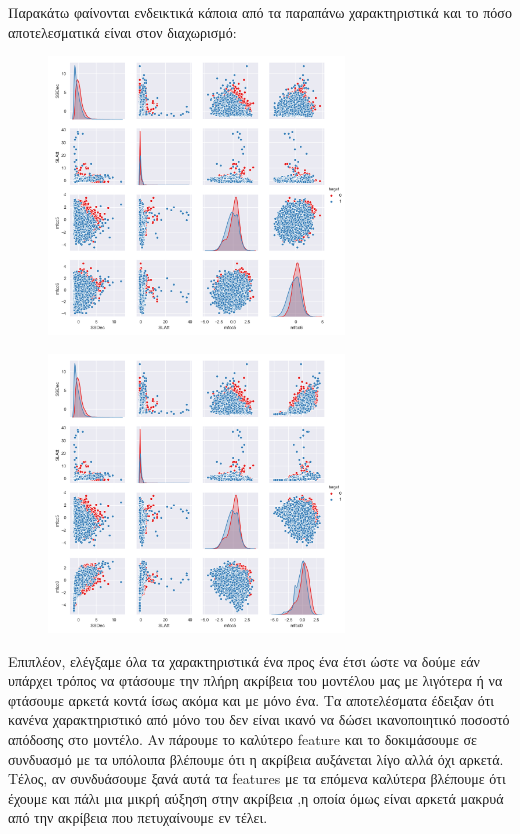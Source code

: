 Παρακάτω φαίνονται ενδεικτικά κάποια από τα παραπάνω χαρακτηριστικά και το πόσο αποτελεσματικά είναι στον διαχωρισμό:

\begin{figure}[h]
\centering
\includegraphics[width=0.7\textwidth]{figure_1.png}
\end{figure}
\begin{figure}[h]
\centering
\includegraphics[width=0.7\textwidth]{figure_2.png}
\end{figure}


Eπιπλέον, ελέγξαμε όλα τα χαρακτηριστικά ένα προς ένα έτσι ώστε να δούμε εάν υπάρχει τρόπος να φτάσουμε την πλήρη ακρίβεια του μοντέλου μας με λιγότερα ή να φτάσουμε αρκετά κοντά ίσως ακόμα και με μόνο ένα. 
Tα αποτελέσματα έδειξαν ότι κανένα χαρακτηριστικό από μόνο του δεν είναι ικανό να δώσει ικανοποιητικό ποσοστό απόδοσης στο μοντέλο. Αν πάρουμε το καλύτερο feature και το δοκιμάσουμε σε συνδυασμό με τα υπόλοιπα βλέπουμε ότι η ακρίβεια αυξάνεται λίγο αλλά όχι αρκετά.  
Τέλος, αν συνδυάσουμε ξανά αυτά τα features με τα επόμενα καλύτερα βλέπουμε ότι έχουμε και πάλι μια μικρή αύξηση στην ακρίβεια ,η οποία όμως είναι αρκετά μακρυά από την ακρίβεια που πετυχαίνουμε εν τέλει. 

